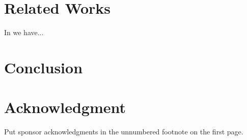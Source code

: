 \documentclass[a4paper, comsoc]{IEEEtran}
\begin{document}
\lipsum[2-10]  %

\section{Related Works}\label{sec:related}

In \cite{LiSurvey2021,Adao2017} we have...

\lipsum[2-8] 

\section{Conclusion}\label{sec:conclusion}
\lipsum[1-3]

\section*{Acknowledgment}
 Put sponsor 
acknowledgments in the unnumbered footnote on the first page.

\printbibliography
\end{document}
